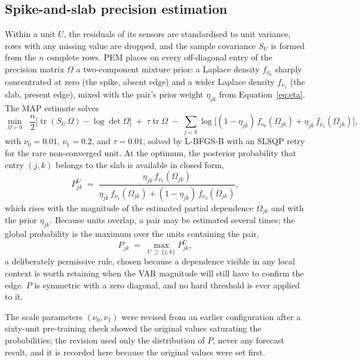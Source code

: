 \documentclass[MTech]{ugthesis}
\begin{document}
\subsection{Spike-and-slab precision estimation}
Within a unit $U$, the residuals of its sensors are standardised to unit variance, rows with any missing value are dropped, and the sample covariance $S_U$ is formed from the $n$ complete rows. PEM \citep{hwang2026pem} places on every off-diagonal entry of the precision matrix $\Omega$ a two-component mixture prior: a Laplace density $f_{\nu_0}$ sharply concentrated at zero (the spike, absent edge) and a wider Laplace density $f_{\nu_1}$ (the slab, present edge), mixed with the pair's prior weight $\eta_{jk}$ from Equation~\eqref{eq:eta}. The \ac{MAP} estimate solves
\begin{equation}
\min_{\Omega \succ 0}\;\;
\frac{n}{2}\Big[\operatorname{tr}(S_U\,\Omega) - \log\det\Omega\Big]
\;+\; \tau\operatorname{tr}\Omega
\;-\; \sum_{j<k}\log\!\Big[(1-\eta_{jk})\,f_{\nu_0}(\Omega_{jk}) + \eta_{jk}\,f_{\nu_1}(\Omega_{jk})\Big],
\label{eq:pemobj}
\end{equation}
with $\nu_0 = 0.01$, $\nu_1 = 0.2$, and $\tau = 0.01$, solved by L-BFGS-B with an SLSQP retry for the rare non-converged unit. At the optimum, the posterior probability that entry $(j,k)$ belongs to the slab is available in closed form,
\begin{equation}
P^{U}_{jk} \;=\;
\frac{\eta_{jk}\, f_{\nu_1}(\Omega_{jk})}
{\eta_{jk}\, f_{\nu_1}(\Omega_{jk}) + (1-\eta_{jk})\, f_{\nu_0}(\Omega_{jk})},
\label{eq:post}
\end{equation}
which rises with the magnitude of the estimated partial dependence $\Omega_{jk}$ and with the prior $\eta_{jk}$. Because units overlap, a pair may be estimated several times; the global probability is the maximum over the units containing the pair,
\begin{equation}
P_{jk} \;=\; \max_{U \,\supseteq\, \{j,k\}} P^{U}_{jk},
\label{eq:agg}
\end{equation}
a deliberately permissive rule, chosen because a dependence visible in any local context is worth retaining when the VAR magnitude will still have to confirm the edge. $P$ is symmetric with a zero diagonal, and no hard threshold is ever applied to it.

The scale parameters $(\nu_0, \nu_1)$ were revised from an earlier configuration after a sixty-unit pre-training check showed the original values saturating the probabilities; the revision used only the distribution of $P$, never any forecast result, and it is recorded here because the original values were set first.
\end{document}
